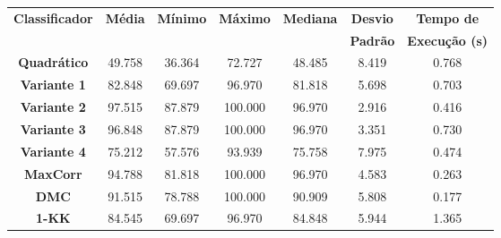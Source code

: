 \begin{tabular}{|c|c|c|c|c|c|c|}%
\hline%
\multirow{2}{*}{\textbf{Classificador}}&\multirow{2}{*}{\textbf{Média}}&\multirow{2}{*}{\textbf{Mínimo}}&\multirow{2}{*}{\textbf{Máximo}}&\multirow{2}{*}{\textbf{Mediana}}&\textbf{Desvio}&\textbf{Tempo de}\\%
&&&&&\textbf{Padrão}&\textbf{Execução (s)}\\%
\hline%
\hline%
\textbf{Quadrático}&49.758&36.364&72.727&48.485&8.419&0.768\\%
\hline%
\textbf{Variante 1}&82.848&69.697&96.970&81.818&5.698&0.703\\%
\hline%
\textbf{Variante 2}&97.515&87.879&100.000&96.970&2.916&0.416\\%
\hline%
\textbf{Variante 3}&96.848&87.879&100.000&96.970&3.351&0.730\\%
\hline%
\textbf{Variante 4}&75.212&57.576&93.939&75.758&7.975&0.474\\%
\hline%
\textbf{MaxCorr}&94.788&81.818&100.000&96.970&4.583&0.263\\%
\hline%
\textbf{DMC}&91.515&78.788&100.000&90.909&5.808&0.177\\%
\hline%
\textbf{1{-}KK}&84.545&69.697&96.970&84.848&5.944&1.365\\%
\hline%
\hline%
\end{tabular}